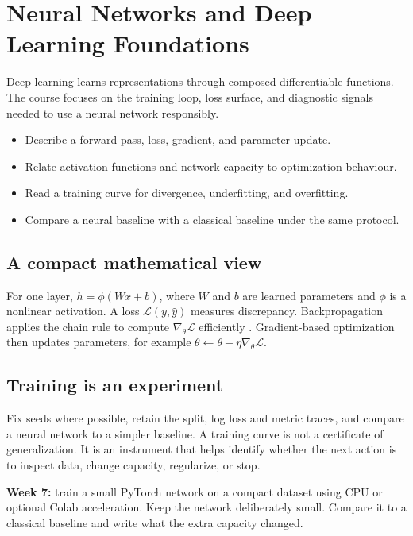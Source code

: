 \chapter{Neural Networks and Deep Learning Foundations}\label{chap:neural}
 Deep learning learns representations through composed differentiable functions. The course focuses on the training loop, loss surface, and diagnostic signals needed to use a neural network responsibly.

\begin{learningbox}
\begin{itemize}
  \item Describe a forward pass, loss, gradient, and parameter update.
  \item Relate activation functions and network capacity to optimization behaviour.
  \item Read a training curve for divergence, underfitting, and overfitting.
  \item Compare a neural baseline with a classical baseline under the same protocol.
\end{itemize}
\end{learningbox}

\section{A compact mathematical view}
For one layer, $h=\phi(Wx+b)$, where $W$ and $b$ are learned parameters and $\phi$ is a nonlinear activation. A loss $\mathcal{L}(y,\hat y)$ measures discrepancy. Backpropagation applies the chain rule to compute $\nabla_\theta \mathcal{L}$ efficiently \citep{rumelhart1986}. Gradient-based optimization then updates parameters, for example $\theta\leftarrow\theta-\eta\nabla_\theta\mathcal{L}$.

\section{Training is an experiment}
Fix seeds where possible, retain the split, log loss and metric traces, and compare a neural network to a simpler baseline. A training curve is not a certificate of generalization. It is an instrument that helps identify whether the next action is to inspect data, change capacity, regularize, or stop.

\begin{labbox}
\textbf{Week 7:} train a small PyTorch network on a compact dataset using CPU or optional Colab acceleration. Keep the network deliberately small. Compare it to a classical baseline and write what the extra capacity changed.
\end{labbox}
